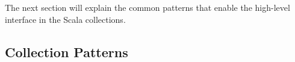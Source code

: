 The next section will explain the common patterns that enable the high-level interface in the Scala collections.

%
%
%


%
%
%
%
%

\subsection{Collection Patterns}

